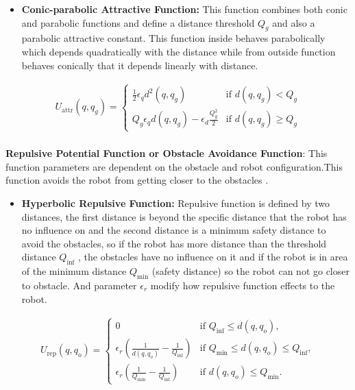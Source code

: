 \begin{itemize}
      \item  \textbf{ Conic-parabolic Attractive Function: }
This function combines both conic and parabolic functions and define a distance threshold $Q_g$ and also a parabolic attractive constant. This function inside behaves parabolically which depends quadratically with the distance while from outside function behaves conically that it depends linearly with distance. 
\end{itemize}

\begin{equation}
\begin{aligned}
U_{\text{attr}}(q, q_g) = 
\begin{cases} 
\frac{1}{2} \epsilon_{q} d^2(q, q_g) & \text{if } d(q, q_g) < Q_g \\
Q_g \epsilon_{q} d(q,q_g) - \epsilon_{d} \frac{Q^2_g}{2} & \text{if } d(q, q_g) \geq Q_g 
\end{cases}
\end{aligned}
\label{eqn:Conic-parabolic attractive function}
\end{equation}  \\

\noindent \textbf {Repulsive Potential Function or Obstacle Avoidance Function}: This function parameters are dependent on the obstacle and robot configuration.This function avoids the robot from getting closer to the obstacles \cite{Pathplanning}.  

\begin{itemize}
      \item  \textbf{ Hyperbolic Repulsive Function: }
Repulsive function is defined by two distances, the first distance is beyond the specific distance that the robot has no influence on and the second distance is a minimum safety distance to avoid the obstacles, so if the robot has    
more distance than the threshold distance $Q_\text{inf}$ , the obstacles have no influence on it and if the robot is in area of the minimum distance $Q_\text{min}$ (safety distance) so the robot can not go closer to obstacle. And parameter $\epsilon_r$ modify how repulsive function effects to the robot. 
\end{itemize}

\begin{equation}
\begin{aligned}
U_{\text{rep}}(q, q_o) = 
\begin{cases} 
0 & \text{if } Q_{\text{inf}} \leq d(q, q_o), \\
\epsilon_r \left( \frac{1}{d(q, q_o)} - \frac{1}{Q_{\text{inf}}} \right) & \text{if } Q_{\text{min}} \leq d(q, q_o) \leq Q_{\text{inf}}, \\
\epsilon_r \left( \frac{1}{Q_{\text{min}}} - \frac{1}{Q_{\text{inf}}} \right) & \text{if } d(q, q_o) \leq Q_{\text{min}}.
\end{cases} 
\end{aligned}
\label{eqn: Hyperbolic Repulsive Function}
\end{equation}  \\

